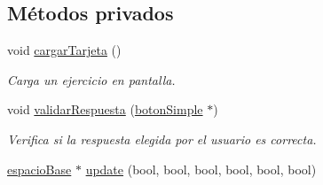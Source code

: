 \subsection*{Métodos privados}
\begin{DoxyCompactItemize}
\item 
void \hyperlink{classespacio_tarjetas_a14b6c40ed3154459f9b1ec511f176613}{cargar\+Tarjeta} ()
\begin{DoxyCompactList}\small\item\em Carga un ejercicio en pantalla. \end{DoxyCompactList}\item 
void \hyperlink{classespacio_tarjetas_a826269ec11513bc1c471d9aa51288a47}{validar\+Respuesta} (\hyperlink{classboton_simple}{boton\+Simple} $\ast$)
\begin{DoxyCompactList}\small\item\em Verifica si la respuesta elegida por el usuario es correcta. \end{DoxyCompactList}\item 
\hyperlink{classespacio_base}{espacio\+Base} $\ast$ \hyperlink{classespacio_tarjetas_a57d9e609b53f6f8248e8f52941890ecf}{update} (bool, bool, bool, bool, bool, bool)
\end{DoxyCompactItemize}
